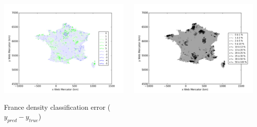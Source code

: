 \documentclass[c]{beamer}
\begin{document}
\begin{frame}
\begin{columns}
 \begin{column}{0.5\textwidth}
  \begin{overlayarea}{\linewidth}{4cm}
    \centering\vfill
    \includegraphics[scale=0.50]{images/France/nn/density_classification_error.png}
  \end{overlayarea}
  \begin{overlayarea}{\linewidth}{0.5cm}
    \centering
    \tiny France density classification error ($y_{pred}-y_{true}$)\par
  \end{overlayarea}
 \end{column}
 \begin{column}{0.5\textwidth}
  \begin{overlayarea}{\linewidth}{4cm}
    \centering\vfill
    \includegraphics[scale=0.50]{images/France/nn/density_covering.png}

\end{overlayarea}
\end{column}
\end{columns}
\end{frame}
\end{document}
